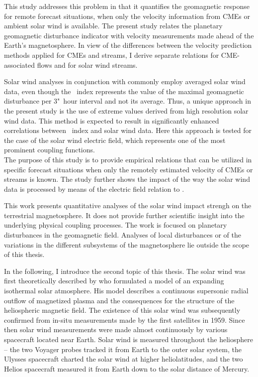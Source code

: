 This study addresses this problem in that it quantifies the geomagnetic response for remote forecast situations, when only the velocity information from CMEs or ambient solar wind is available.
The present study relates the planetary geomagnetic disturbance indicator \Kp{} with velocity measurements made ahead of the Earth's magnetosphere. In view of the differences between the velocity prediction methods applied for CMEs and streams, I derive separate relations for CME-associated flows and for solar wind streams.

Solar wind analyses in conjunction with \Kp{} commonly employ averaged solar wind data, even though the \Kp~index represents the value of the maximal geomagnetic disturbance per 3"~hour interval and not its average. Thus, a unique approach in the present study is the use of extreme values derived from high resolution solar wind data. This method is expected to result in significantly enhanced correlations between \Kp~index and solar wind data. Here this approach is tested for the case of the solar wind electric field, which represents one of the most prominent coupling functions.\\

The purpose of this study is to provide empirical \Kp{} relations that can be utilized in specific forecast situations when only the remotely estimated velocity of CMEs or streams is known.
The study further shows the impact of the way the solar wind data is processed by means of the electric field relation to \Kp{}.

This work presents quantitative analyses of the solar wind impact strengh on the terrestrial magnetosphere. It does not provide further scientific insight into the underlying physical coupling processes.
The work is focused on planetary disturbances in the geomagnetic field. Analyses of local disturbances or of the variations in the different subsystems of the magnetosphere lie outside the scope of this thesis.

\bigskip

In the following, I introduce the second topic of this thesis.
The solar wind was first theoretically described by \citet{Parker1958} who formulated a model of an expanding isothermal solar atmosphere. His model describes a continuous supersonic radial outflow of magnetized plasma and the consequences for the structure of the heliospheric magnetic field. The existence of this solar wind was subsequently confirmed from in-situ measurements made by the first satellites in 1959. Since then solar wind measurements were made almost continuously by various spacecraft located near Earth. Solar wind is measured throughout the heliosphere -- the two Voyager probes tracked it from Earth to the outer solar system, the Ulysses spacecraft charted the solar wind at higher heliolatitudes, and the two Helios spacecraft measured it from Earth down to the solar distance of Mercury.\\

